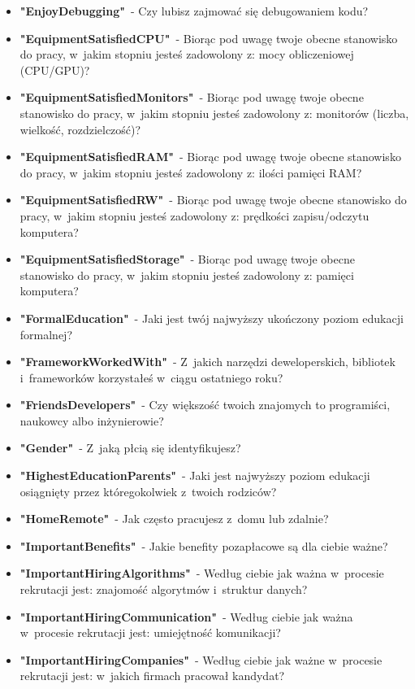 \begin{appendices}
\begin{itemize}
        \item \textbf{"EnjoyDebugging"}~- Czy lubisz zajmować się debugowaniem kodu?
        \item \textbf{"EquipmentSatisfiedCPU"}~- Biorąc pod uwagę twoje obecne stanowisko do pracy, w~jakim stopniu jesteś zadowolony z: mocy obliczeniowej (CPU/GPU)?
        \item \textbf{"EquipmentSatisfiedMonitors"}~- Biorąc pod uwagę twoje obecne stanowisko do pracy, w~jakim stopniu jesteś zadowolony z: monitorów (liczba, wielkość, rozdzielczość)?
        \item \textbf{"EquipmentSatisfiedRAM"}~- Biorąc pod uwagę twoje obecne stanowisko do pracy, w~jakim stopniu jesteś zadowolony z: ilości pamięci RAM?
        \item \textbf{"EquipmentSatisfiedRW"}~- Biorąc pod uwagę twoje obecne stanowisko do pracy, w~jakim stopniu jesteś zadowolony z: prędkości zapisu/odczytu komputera?
        \item \textbf{"EquipmentSatisfiedStorage"}~- Biorąc pod uwagę twoje obecne stanowisko do pracy, w~jakim stopniu jesteś zadowolony z: pamięci komputera?
        \item \textbf{"FormalEducation"}~- Jaki jest twój najwyższy ukończony poziom edukacji formalnej?
        \item \textbf{"FrameworkWorkedWith"}~- Z~jakich narzędzi deweloperskich, bibliotek i~frameworków korzystałeś w~ciągu ostatniego roku?
        \item \textbf{"FriendsDevelopers"}~- Czy większość twoich znajomych to programiści, naukowcy albo inżynierowie?
        \item \textbf{"Gender"}~- Z~jaką płcią się identyfikujesz?
        \item \textbf{"HighestEducationParents"}~- Jaki jest najwyższy poziom edukacji osiągnięty przez któregokolwiek z~twoich rodziców?
        \item \textbf{"HomeRemote"}~- Jak często pracujesz z~domu lub zdalnie?
        \item \textbf{"ImportantBenefits"}~- Jakie benefity pozapłacowe są dla ciebie ważne?
        \item \textbf{"ImportantHiringAlgorithms"}~- Według ciebie jak ważna w~procesie rekrutacji jest: znajomość algorytmów i~struktur danych?
        \item \textbf{"ImportantHiringCommunication"}~- Według ciebie jak ważna w~procesie rekrutacji jest: umiejętność komunikacji?
        \item \textbf{"ImportantHiringCompanies"}~- Według ciebie jak ważne w~procesie rekrutacji jest: w~jakich firmach pracował kandydat?

\end{itemize}
\end{appendices}

